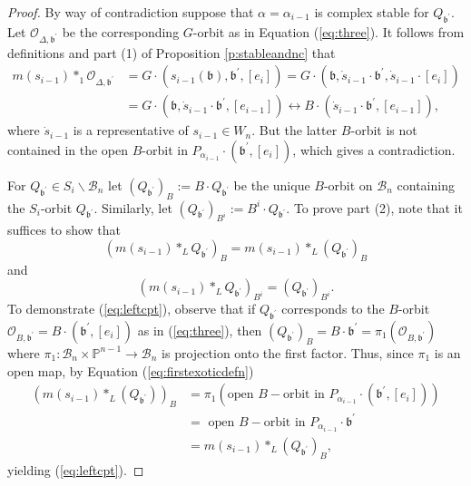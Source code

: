 \documentclass[12pt]{amsart}
\numberwithin{equation}{section}
\newcommand{\fb}{\mbox{${\mathfrak b}$}}
\newcommand{\B}{\mathcal{B}}
\begin{document}
\begin{proof}
By way of contradiction suppose that $\alpha=\alpha_{i-1}$ is complex stable 
for $Q_{\fb^{\prime}}$.  Let $\mathcal{O}_{\Delta, \fb^{\prime}}$ be the corresponding 
$G$-orbit as in Equation (\ref{eq:three}).  It follows from definitions and part (1) of Proposition \ref{p:stableandnc} that
\begin{equation*} 
\begin{split}
m(s_{i-1})*_{1}\mathcal{O}_{\Delta, \fb^{\prime}}&=G\cdot (s_{i-1}(\fb), \fb^{\prime}, [e_{i}])=G\cdot (\fb, \dot{s}_{i-1}\cdot \fb^{\prime}, \dot{s}_{i-1}\cdot[e_{i}])\\
&=G\cdot(\fb, \dot{s}_{i-1}\cdot\fb^{\prime}, [e_{i-1}])\leftrightarrow B\cdot (\dot{s}_{i-1}\cdot\fb^{\prime}, [e_{i-1}]),
\end{split}
\end{equation*} 
where $\dot{s}_{i-1}$ is a representative of $s_{i-1}\in W_{n}$.  But the latter $B$-orbit is not contained in the open $B$-orbit in $P_{\alpha_{i-1}}\cdot (\fb^{\prime}, [e_{i}])$, which gives a contradiction. 

For $Q_{\fb^{\prime}}\in S_{i}\backslash\B_{n}$ let $(Q_{\fb^{\prime}})_{B}:=B\cdot Q_{\fb^{\prime}}$ be the unique $B$-orbit on $\B_{n}$ containing the $S_{i}$-orbit $Q_{\fb^{\prime}}$.  Similarly, let $(Q_{\fb^{\prime}})_{B^{i}}:=B^{i}\cdot Q_{\fb^{\prime}}$.  To prove part (2), note that it suffices to show that 
\begin{equation}\label{eq:leftcpt}
(m(s_{i-1})*_{L}Q_{\fb^{\prime}})_{B}=m(s_{i-1})*_{L}(Q_{\fb^{\prime}})_{B}
\end{equation}
and
\begin{equation}\label{eq:rightcpt}
(m(s_{i-1})*_{L} Q_{\fb^{\prime}})_{B^{i}}=(Q_{\fb^{\prime}})_{B^{i}}. 
\end{equation}
To demonstrate (\ref{eq:leftcpt}), observe that if 
$Q_{\fb^{\prime}}$ corresponds to the $B$-orbit $\mathcal{O}_{B,\fb^{\prime}}=B\cdot (\fb^{\prime}, [e_{i}])$ as in (\ref{eq:three}), then $(Q_{\fb^{\prime}})_{B}=B\cdot \fb^{\prime}=\pi_{1}(\mathcal{O}_{B,\fb^{\prime}})$ where $\pi_{1}:\B_{n}\times\mathbb{P}^{n-1}\to \B_{n}$ is projection onto the first factor.  
Thus, since $\pi_{1}$ is an open map, by Equation (\ref{eq:firstexoticdefn})
\begin{equation*}
\begin{split}
(m(s_{i-1})*_{L}(Q_{\fb^{\prime}}))_{B}&=\pi_{1}(\mbox{open } B-\mbox{orbit in } P_{\alpha_{i-1}} \cdot (\fb^{\prime}, [e_{i}]))\\
&=\mbox{ open } B-\mbox{orbit in } P_{\alpha_{i-1}}\cdot\fb^{\prime}\\&=m(s_{i-1})*_{L}(Q_{\fb^{\prime}})_{B},
\end{split}
\end{equation*}
yielding (\ref{eq:leftcpt}).  


\end{proof}
\end{document}
